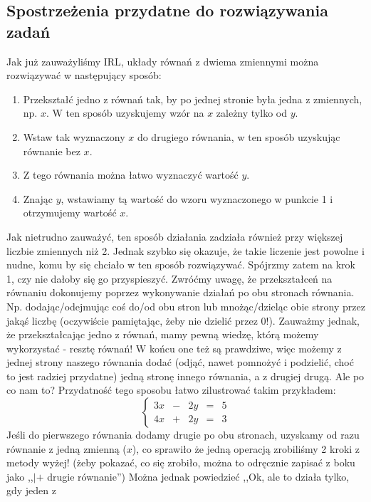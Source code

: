 \documentclass{article}
\theoremstyle{remark}
\begin{document}
\subsection{Spostrzeżenia przydatne do rozwiązywania zadań}
Jak już zauważyliśmy IRL, układy równań z dwiema zmiennymi można rozwiązywać w 
następujący sposób:
\begin{enumerate}
  \item Przekształć jedno z równań tak, by po jednej stronie była 
  jedna z zmiennych, np. $x$. W ten sposób uzyskujemy
  wzór na $x$ zależny tylko od $y$.
  \item Wstaw tak wyznaczony $x$ do drugiego równania, 
  w ten sposób uzyskując równanie bez $x$.
  \item Z tego równania można łatwo wyznaczyć wartość $y$.
  \item Znając $y$, wstawiamy tą wartość do wzoru wyznaczonego w punkcie 1 
  i otrzymujemy wartość $x$.
\end{enumerate}
Jak nietrudno zauważyć, ten sposób działania zadziała również przy większej 
liczbie zmiennych niż 2. Jednak szybko się okazuje, że takie liczenie jest powolne
i nudne, komu by się chciało w ten sposób rozwiązywać. Spójrzmy zatem na krok 1, czy nie
dałoby się go przyspieszyć. Zwróćmy uwagę, że przekształceń na równaniu dokonujemy 
poprzez wykonywanie działań po obu stronach równania. Np. 
dodając/odejmując coś do/od obu stron lub mnożąc/dzieląc obie strony przez jakąś liczbę
(oczywiście pamiętając, żeby nie dzielić przez 0!). 
Zauważmy jednak, że przekształcając jedno z równań, mamy pewną wiedzę, 
którą możemy wykorzystać - resztę równań! W końcu one też są prawdziwe, więc możemy z
jednej strony naszego równania dodać 
(odjąć, nawet pomnożyć i podzielić, choć to jest radziej przydatne)
jedną stronę innego równania, a z drugiej drugą.
Ale po co nam to? Przydatność tego sposobu łatwo zilustrować takim przykładem:
\begin{displaymath}
  \left\{ 
    \begin{array}{lllll}
      3x &-& 2y &=& 5\\
      4x &+& 2y &=& 3
    \end{array}
    \right.
\end{displaymath}
Jeśli do pierwszego równania dodamy drugie po obu stronach, uzyskamy od razu
równanie z jedną zmienną ($x$), 
co sprawiło że jedną operacją zrobiliśmy 2 kroki z metody wyżej!
(żeby pokazać, co się zrobiło, można to odręcznie zapisać z boku jako ,,$| +$ drugie równanie'')
Można jednak powiedzieć ,,Ok, ale to działa tylko, gdy jeden z 
\end{document}
